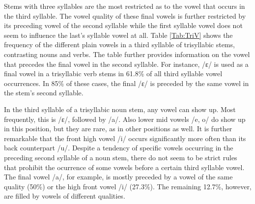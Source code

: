 Stems with three syllables are the most restricted as to the vowel that occurs in the third syllable. The vowel quality of these final vowels is further restricted by its preceding vowel of the second syllable while the first syllable vowel does not seem to influence the last's syllable vowel at all. Table \ref{Tab:TriV} shows the frequency of the different plain vowels in a third syllable of trisyllabic stems, contrasting nouns and verbs. The table further provides information on the vowel that precedes the final vowel in the second syllable. For instance, /ɛ/ is used as a final vowel in a trisyllabic verb stems in 61.8\% of all third syllable vowel occurrences. In 85\% of these cases, the final /ɛ/ is preceded by the same vowel in the stem's second syllable.

\begin{table} 
\centering
{}
\caption{Frequency of $\sigma$3 plain vowels in trisyllabic stems}
\label{Tab:TriV}
\end{table}

In the third syllable of a trisyllabic noun stem, any vowel can show up. Most frequently, this is /ɛ/, followed by /a/. Also lower mid vowels /e, o/ do show up in this position, but they are rare, as in other positions as well.  It is further remarkable that the front high vowel /i/ occurs significantly more often than its back counterpart /u/. Despite a tendency of specific vowels occurring in the preceding second syllable of a noun stem, there do not seem to be strict rules that prohibit the ocurrence of some vowels before a certain third syllable vowel. The final vowel /a/, for example, is mostly preceded by a vowel of the same quality (50\%) or the high front vowel /i/ (27.3\%). The remaining 12.7\%, however, are filled by vowels of different qualities.

